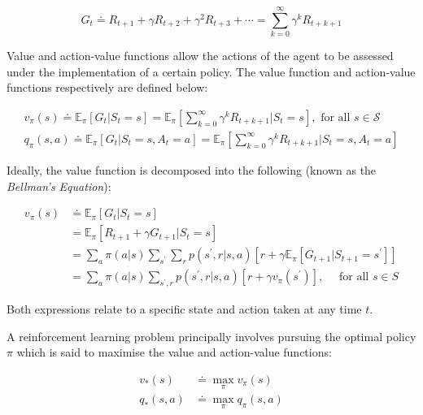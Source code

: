\documentclass[12pt]{article}
\begin{document}
$$
G _ { t } \doteq R _ { t + 1 } + \gamma R _ { t + 2 } + \gamma ^ { 2 } R _ { t + 3 } + \cdots = \sum _ { k = 0 } ^ { \infty } \gamma ^ { k } R _ { t + k + 1 }
$$

Value and action-value functions allow the actions of the agent to be assessed under the implementation of a certain policy. The value function and action-value functions respectively are defined below:

$$
\begin{aligned}
v _ { \pi } ( s ) \doteq \mathbb { E } _ { \pi } \left[ G _ { t } | S _ { t } = s \right] = \mathbb { E } _ { \pi } \left[ \sum _ { k = 0 } ^ { \infty } \gamma ^ { k } R _ { t + k + 1 } | S _ { t } = s \right] , \text { for all } s \in \mathcal{S} \\
q _ { \pi } ( s , a ) \doteq \mathbb { E } _ { \pi } \left[ G _ { t } | S _ { t } = s , A _ { t } = a \right] = \mathbb { E } _ { \pi } \left[ \sum _ { k = 0 } ^ { \infty } \gamma ^ { k } R _ { t + k + 1 } | S _ { t } = s , A _ { t } = a \right]
\end{aligned}
$$ 

Ideally, the value function is decomposed into the following (known as the \textit{Bellman's Equation}):

$$
\begin{aligned} v _ { \pi } ( s ) & \doteq \mathbb { E } _ { \pi } \left[ G _ { t } | S _ { t } = s \right] \\ & = \mathbb { E } _ { \pi } \left[ R _ { t + 1 } + \gamma G _ { t + 1 } | S _ { t } = s \right] \\ & = \sum _ { a } \pi ( a | s ) \sum _ { s ^ { \prime } } \sum _ { r } p \left( s ^ { \prime } , r | s , a \right) \left[ r + \gamma \mathbb { E } _ { \pi } \left[ G _ { t + 1 } | S _ { t + 1 } = s ^ { \prime } \right] \right] \\ & = \sum _ { a } \pi ( a | s ) \sum _ { s ^ { \prime } , r } p \left( s ^ { \prime } , r | s , a \right) \left[ r + \gamma v _ { \pi } \left( s ^ { \prime } \right) \right] , \quad \text { for all } s \in S \end{aligned}
$$

Both expressions relate to a specific state and action taken at any time $t$.

A reinforcement learning problem principally involves pursuing the optimal policy $\pi$ which is said to maximise the value and action-value functions:

$$
\begin{aligned}
v _ { * } ( s ) &\doteq \max _ { \pi } v _ { \pi } ( s )\\
q _ { * } ( s , a ) &\doteq \max _ { \pi } q _ { \pi } ( s , a )
\end{aligned}
$$
\end{document}
